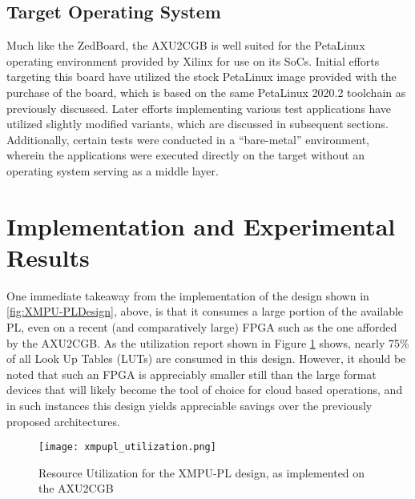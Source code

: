 \subsection{Target Operating System}\label{subsec:DMAEnvironmentOS}
Much like the ZedBoard, the AXU2CGB is well suited for the PetaLinux operating environment provided by Xilinx for use on its SoCs. Initial efforts targeting this board have utilized the stock PetaLinux image provided with the purchase of the board, which is based on the same PetaLinux 2020.2 toolchain as previously discussed. Later efforts implementing various test applications have utilized slightly modified variants, which are discussed in subsequent sections. Additionally, certain tests were conducted in a ``bare-metal'' environment, wherein the applications were executed directly on the target without an operating system serving as a middle layer.

\section{Implementation and Experimental Results}\label{sec:DMAResults}
One immediate takeaway from the implementation of the design shown in \ref{fig:XMPU-PLDesign}, above, is that it consumes a large portion of the available PL, even on a recent (and comparatively large) FPGA such as the one afforded by the AXU2CGB. As the utilization report shown in Figure \ref{fig:XMPU-PLUtilization} shows, nearly 75\% of all Look Up Tables (LUTs) are consumed in this design. However, it should be noted that such an FPGA is appreciably smaller still than the large format devices that will likely become the tool of choice for cloud based operations, and in such instances this design yields appreciable savings over the previously proposed architectures.

\begin{figure}
    \centering
    \texttt{[image: xmpupl\_utilization.png]}
    \caption[Memory Isolation Resource Utilization]{Resource Utilization for the XMPU-PL design, as implemented on the AXU2CGB}
    \label{fig:XMPU-PLUtilization}
\end{figure}